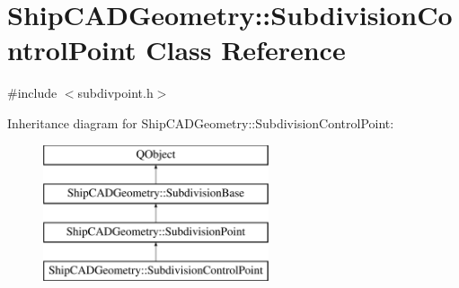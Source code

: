 \hypertarget{classShipCADGeometry_1_1SubdivisionControlPoint}{\section{Ship\-C\-A\-D\-Geometry\-:\-:Subdivision\-Control\-Point Class Reference}
\label{classShipCADGeometry_1_1SubdivisionControlPoint}
}


{\ttfamily \#include $<$subdivpoint.\-h$>$}

Inheritance diagram for Ship\-C\-A\-D\-Geometry\-:\-:Subdivision\-Control\-Point\-:\begin{figure}[H]
\begin{center}
\leavevmode
\includegraphics[height=4.000000cm]{classShipCADGeometry_1_1SubdivisionControlPoint}
\end{center}
\end{figure}
